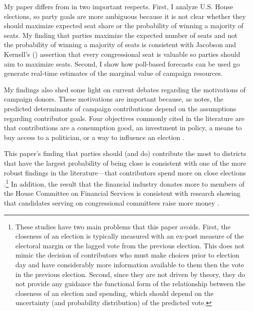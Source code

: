 \documentclass[12pt,final,fleqn]{article}
\theoremstyle{plain}
\begin{document}
My paper differs from \citet*{stromberg2008electoral} in two important respects. First, I analyze U.S. House elections, so party goals are more ambiguous because it is not clear whether they should maximize expected seat share or the probability of winning a majority of seats. My finding that parties maximize the expected number of seats and not the probability of winning a majority of seats is consistent with Jacobson and Kernell's (\citeyear{jacobson1985party}) assertion that every congressional seat is valuable so parties should aim to maximize seats. Second, I show how poll-based forecasts can be used go generate real-time estimates of the marginal value of campaign resources.

My findings also shed some light on current debates regarding the motivations of campaign donors. These motivations are important because, as \citet{stratmann2005some} notes, the predicted determinants of campaign contributions depend on the assumptions regarding contributor goals. Four objectives commonly cited in the literature are that contributions are a consumption good, an investment in policy, a means to buy access to a politician, or a way to influence an election \citep[e.g.][]{ansolabehere2003there, stratmann2005some}. 

This paper's finding that parties should (and do) contribute the most to districts that have the largest probability of being close is consistent with one of the more robust findings in the literature---that contributors spend more on close elections \citep{kau1982general, jacobson1985money, poole1985patterns, stratmann1991campaign}.\footnote{These studies have two main problems that this paper avoids. First, the closeness of an election is typically measured with an ex-post measure of the electoral margin or the lagged vote from the previous election. This does not mimic the decision of contributors who must make choices prior to election day and have considerably more information available to them then the vote in the previous election. Second, since they are not driven by theory, they do not provide any guidance the functional form of the relationship between the closeness of an election and spending, which should depend on the uncertainty (and probability distribution) of the predicted vote.} In addition, the result that the financial industry donates more to members of the House Committee on Financial Services is consistent with research showing that candidates serving on congressional committees raise more money \citep{grier1991committee, romer1994empirical, kroszner1998interest}.  
\end{document}
